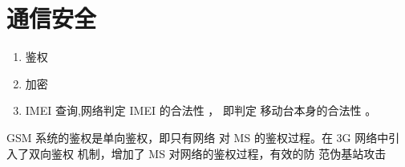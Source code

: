 \section{通信安全}
\begin{enumerate}
	\item 鉴权
	\item 加密
	\item IMEI 查询,网络判定 IMEI 的合法性 ， 即判定
	移动台本身的合法性 。
\end{enumerate}
GSM 系统的鉴权是单向鉴权，即只有网络
对 MS 的鉴权过程。在 3G 网络中引入了双向鉴权
机制，增加了 MS 对网络的鉴权过程，有效的防
范伪基站攻击








